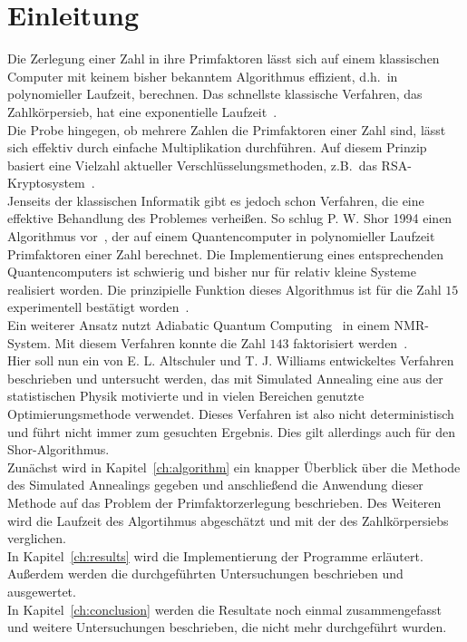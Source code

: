 \chapter{Einleitung}
\setcounter{page}{1}
Die Zerlegung einer Zahl in ihre Primfaktoren lässt sich auf einem klassischen Computer mit keinem bisher bekanntem Algorithmus effizient, d.h.\ in polynomieller Laufzeit, berechnen. Das schnellste klassische Verfahren, das Zahlkörpersieb, hat eine exponentielle Laufzeit~\parencite{pomerance}.\\
Die Probe hingegen, ob mehrere Zahlen die Primfaktoren einer Zahl sind, lässt sich effektiv durch einfache Multiplikation durchführen. Auf diesem Prinzip basiert eine Vielzahl aktueller Verschlüsselungsmethoden, z.B.\ das RSA-Kryptosystem~\parencite{rsa}. \\
Jenseits der klassischen Informatik gibt es jedoch schon Verfahren, die eine effektive Behandlung des Problemes verheißen. So schlug P. W. Shor 1994 einen Algorithmus vor~\parencite{shor}, der auf einem Quantencomputer in polynomieller Laufzeit Primfaktoren einer Zahl berechnet. Die Implementierung eines entsprechenden Quantencomputers ist schwierig und bisher nur für relativ kleine Systeme realisiert worden. Die prinzipielle Funktion dieses Algorithmus ist für die Zahl $15$ experimentell bestätigt worden~\parencite{vandersypen}.\\
Ein weiterer Ansatz nutzt Adiabatic Quantum Computing~\parencite{suter} in einem NMR-System. Mit diesem Verfahren konnte die Zahl $143$ faktorisiert werden~\parencite{xu}. \\
Hier soll nun ein von E. L. Altschuler und T. J. Williams entwickeltes Verfahren~\parencite{altschuler} beschrieben und untersucht werden, das mit Simulated Annealing eine aus der statistischen Physik motivierte und in vielen Bereichen genutzte Optimierungsmethode verwendet. Dieses Verfahren ist also nicht deterministisch und führt nicht immer zum gesuchten Ergebnis. Dies gilt allerdings auch für den Shor-Algorithmus.\\
Zunächst wird in Kapitel~\ref{ch:algorithm} ein knapper Überblick über die Methode des Simulated Annealings gegeben und anschließend die Anwendung dieser Methode auf das Problem der Primfaktorzerlegung beschrieben. Des Weiteren wird die Laufzeit des Algortihmus abgeschätzt und mit der des Zahlkörpersiebs verglichen.\\
In Kapitel~\ref{ch:results} wird die Implementierung der Programme erläutert. Außerdem werden die durchgeführten Untersuchungen beschrieben und ausgewertet.\\
In Kapitel~\ref{ch:conclusion} werden die Resultate noch einmal zusammengefasst und weitere Untersuchungen beschrieben, die nicht mehr durchgeführt wurden.
